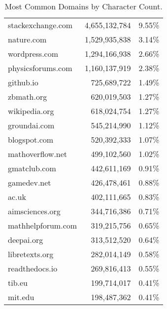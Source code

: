 \begin{table}[b!]
\begin{minipage}{0.48\textwidth}
{\begin{tabular}{lrr}
                \midrule
                stackexchange.com & 4,655,132,784 & 9.55\% \\ 
                nature.com & 1,529,935,838 & 3.14\% \\ 
                wordpress.com & 1,294,166,938 & 2.66\% \\ 
                physicsforums.com & 1,160,137,919 & 2.38\% \\ 
                github.io & 725,689,722 & 1.49\% \\ 
                zbmath.org & 620,019,503 & 1.27\% \\ 
                wikipedia.org & 618,024,754 & 1.27\% \\ 
                groundai.com & 545,214,990 & 1.12\% \\ 
                blogspot.com & 520,392,333 & 1.07\% \\ 
                mathoverflow.net & 499,102,560 & 1.02\% \\ 
                gmatclub.com & 442,611,169 & 0.91\% \\ 
                gamedev.net & 426,478,461 & 0.88\% \\ 
                ac.uk & 402,111,665 & 0.83\% \\ 
                aimsciences.org & 344,716,386 & 0.71\% \\ 
                mathhelpforum.com & 319,215,756 & 0.65\% \\ 
                deepai.org & 313,512,520 & 0.64\% \\ 
                libretexts.org & 282,014,149 & 0.58\% \\ 
                readthedocs.io & 269,816,413 & 0.55\% \\ 
                tib.eu & 199,714,017 & 0.41\% \\ 
                mit.edu & 198,487,362 & 0.41\% \\
        \end{tabular}
        }
        \caption{Most Common Domains by Character Count.}
        \label{table:top-domains-by-characters}
    \end{minipage}
\end{table}
